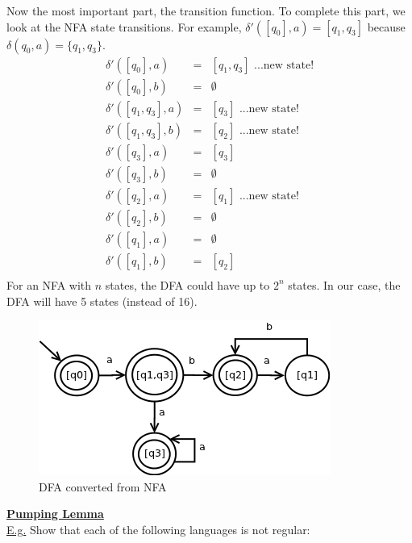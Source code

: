 \documentclass[8pt,letterpaper,twocolumn]{article}
\begin{document}
\begin{enumerate}
  Now the most important part, the transition function.
  To complete this part, we look at the NFA state transitions.
  For example, $\delta'([q_0],a) = [q_1,q_3]$ because $\delta(q_0, a) = \{q_1,q_3\}$.
  \begin{eqnarray*}
  \delta'([q_0],a) &=& [q_1,q_3] \mbox{ ...new state!}\\
  \delta'([q_0],b) &=& \emptyset\\
  \delta'([q_1,q_3],a) &=& [q_3] \mbox{ ...new state!}\\
  \delta'([q_1,q_3],b) &=& [q_2] \mbox{ ...new state!}\\
  \delta'([q_3],a) &=& [q_3]\\
  \delta'([q_3],b) &=& \emptyset\\
  \delta'([q_2],a) &=& [q_1] \mbox{ ...new state!}\\
  \delta'([q_2],b) &=& \emptyset\\
  \delta'([q_1],a) &=& \emptyset\\
  \delta'([q_1],b) &=& [q_2]\\
  \end{eqnarray*}
  For an NFA with $n$ states, the DFA could have up to $2^n$ states.
  In our case, the DFA will have 5 states (instead of 16).\\
  
\begin{figure}[h!]
  \centering
    \includegraphics[scale=0.5]{dfa-from-nfa.png}
  \caption{DFA converted from NFA}
  \label{DFA}
\end{figure}

\end{enumerate}
\underline{\textbf{Pumping Lemma}}\\
\underline{E.g.}
Show that each of the following languages is not regular:
\end{document}
